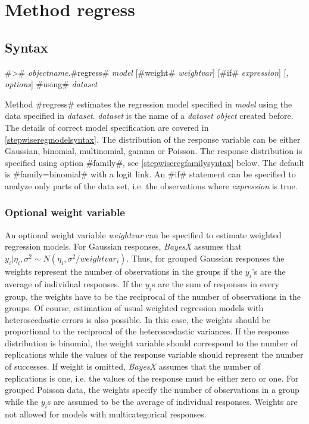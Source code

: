 \section{Method regress}
  \label{stepwiseregregress}

\subsection{Syntax}
\label{stepwiseregregresssyntax}

#># {\em objectname}.#regress# {\em model} [#weight# {\em weightvar}] [#if# {\em expression}] [{\em , options}] #using# {\em dataset}

Method #regress# estimates the regression model specified in {\em
model} using the data specified in {\em dataset}. {\em dataset} is
the name of a {\em dataset object} created before. The details
of correct model specification are covered in
\autoref{stepwiseregmodelsyntax}. The distribution of the response
variable can be either Gaussian, binomial, multinomial, gamma or Poisson.
The response distribution is specified using
option #family#, see \autoref{stepwiseregfamilysyntax} below. The
default is #family=binomial# with a logit link. An #if# statement
can be specified to analyze only parts of the data set, i.e. the
observations where {\em expression} is true.

\subsubsection{Optional weight variable}
\label{stepwiseregweightspecification}

An optional weight variable {\em weightvar} can be specified to
estimate weighted regression models. For Gaussian responses, {\em
BayesX} assumes that $y_i|\eta_i,\sigma^2 \sim
N(\eta_i,\sigma^2/weightvar_i)$. Thus, for grouped Gaussian
responses the weights represent the number of observations in the
groups if the $y_i$'s are the average of individual responses. If
the $y_i$s are the sum of responses in every group, the weights have
to be the reciprocal of the number of observations in the groups. Of
course, estimation of usual weighted regression models with
heteroscedastic errors is also possible. In this case, the weights
should be proportional to the reciprocal of the heteroscedastic
variances. If the response distribution is binomial, the weight
variable should correspond to the number of replications while the
values of the response variable should represent the number of
successes. If weight is omitted, {\em BayesX} assumes that the
number of replications is one, i.e. the values of the response must
be either zero or one. For grouped Poisson data, the weights
specify the number of observations in a group while the $y_i$s are
assumed to be the average of individual responses. Weights are not
allowed for models with multicategorical responses.

